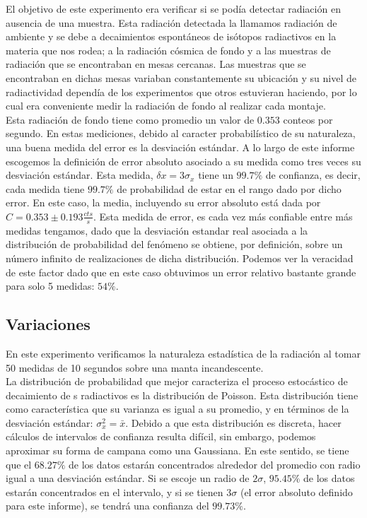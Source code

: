 \documentclass[%
 reprint,
 amsmath,amssymb,
 aps,
]{revtex4-1}
\begin{document}
El objetivo de este experimento era verificar si se podía detectar radiación en ausencia de una muestra. Esta radiación detectada la llamamos radiación de ambiente y se debe a decaimientos espontáneos de isótopos radiactivos en la materia que nos rodea; a la radiación cósmica de fondo y a las muestras de radiación que se encontraban en mesas cercanas. Las muestras que se encontraban en dichas mesas variaban constantemente su ubicación y su nivel de radiactividad dependía de los experimentos que otros estuvieran haciendo, por lo cual era conveniente medir la radiación de fondo al realizar cada montaje.\\

Esta radiación de fondo tiene como promedio un valor de $0.353$ conteos por segundo. En estas mediciones, debido al caracter probabilístico de su naturaleza, una buena medida del error es la desviación estándar. A lo largo de este informe escogemos la definición de error absoluto asociado a su medida como tres veces su desviación estándar. Esta medida, $\delta x = 3\sigma_x$ tiene un $99.7\%$ de confianza, es decir, cada medida tiene  $99.7\%$ de probabilidad de estar en el rango dado por dicho error. En este caso, la media, incluyendo su error absoluto está dada por $C = 0.353 \pm 0.193\frac{cts}{s}$. Esta medida de error, es cada vez más confiable entre más medidas tengamos, dado que la desviación estandar real asociada a la distribución de probabilidad del fenómeno se obtiene, por definición, sobre un número infinito de realizaciones de dicha distribución. Podemos ver la veracidad de este factor dado que en este caso obtuvimos un error relativo bastante grande para solo 5 medidas: $54\%$.\\

\subsection{\label{sec:level2}Variaciones} 
En este experimento verificamos la naturaleza estadística de la radiación al tomar 50 medidas de 10 segundos sobre una manta incandescente.\\

La distribución de probabilidad que mejor caracteriza el proceso estocástico de decaimiento de s radiactivos es la distribución de Poisson. Esta distribución tiene como característica que su varianza es igual a su promedio, y en términos de la desviación estándar: $\sigma_x^2 = \bar{x}$. Debido a que esta distribución es discreta, hacer cálculos de intervalos de confianza resulta difícil, sin embargo, podemos aproximar su forma de campana como una Gaussiana. En este sentido, se tiene que el $68.27\%$ de los datos estarán concentrados alrededor del promedio con radio igual a una desviación estándar. Si se escoje un radio de $2\sigma$, $95.45\%$ de los datos estarán concentrados en el intervalo, y si se tienen $3\sigma$ (el error absoluto definido para este informe), se tendrá una confianza del $99.73\%$.\\
\end{document}

